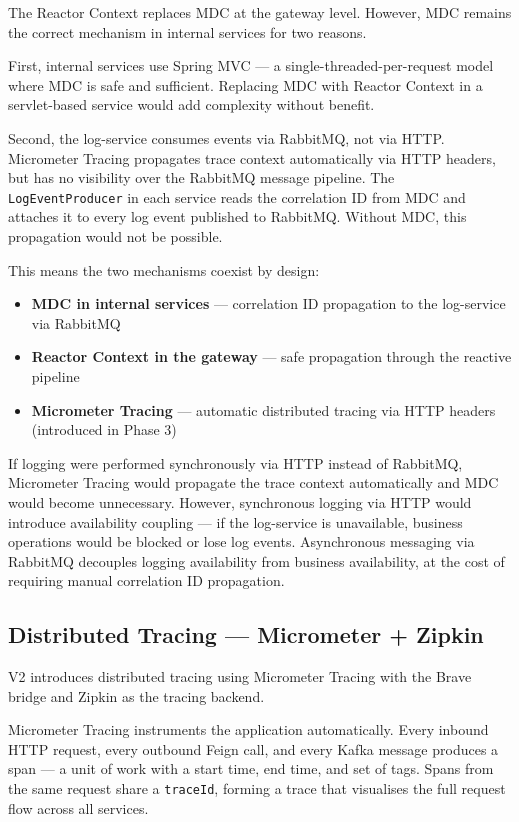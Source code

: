 The Reactor Context replaces MDC at the gateway level. However, MDC remains the correct mechanism in internal services for two reasons.

First, internal services use Spring MVC --- a single-threaded-per-request model where MDC is safe and sufficient. Replacing MDC with Reactor Context in a servlet-based service would add complexity without benefit.

Second, the log-service consumes events via RabbitMQ, not via HTTP. Micrometer Tracing propagates trace context automatically via HTTP headers, but has no visibility over the RabbitMQ message pipeline. The \texttt{LogEventProducer} in each service reads the correlation ID from MDC and attaches it to every log event published to RabbitMQ. Without MDC, this propagation would not be possible.

This means the two mechanisms coexist by design:

\begin{itemize}
    \item \textbf{MDC in internal services} --- correlation ID propagation to the log-service via RabbitMQ
    \item \textbf{Reactor Context in the gateway} --- safe propagation through the reactive pipeline
    \item \textbf{Micrometer Tracing} --- automatic distributed tracing via HTTP headers (introduced in Phase 3)
\end{itemize}

If logging were performed synchronously via HTTP instead of RabbitMQ, Micrometer Tracing would propagate the trace context automatically and MDC would become unnecessary. However, synchronous logging via HTTP would introduce availability coupling --- if the log-service is unavailable, business operations would be blocked or lose log events. Asynchronous messaging via RabbitMQ decouples logging availability from business availability, at the cost of requiring manual correlation ID propagation.

\subsection{Distributed Tracing — Micrometer + Zipkin}

V2 introduces distributed tracing using Micrometer Tracing with the Brave bridge and Zipkin as the tracing backend.

Micrometer Tracing instruments the application automatically. Every inbound HTTP request, every outbound Feign call, and every Kafka message produces a span --- a unit of work with a start time, end time, and set of tags. Spans from the same request share a \texttt{traceId}, forming a trace that visualises the full request flow across all services.


